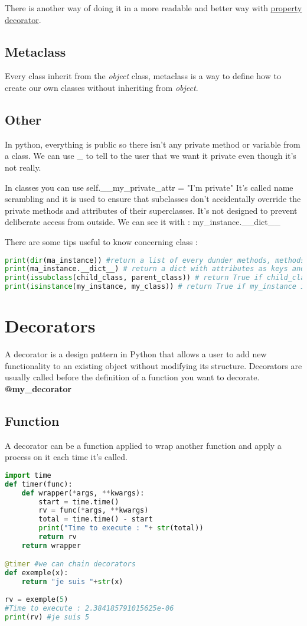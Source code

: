 \documentclass[a4paper, 12pt, titlepage]{scrartcl} %
\begin{document}
There is another way of doing it in a more readable and better way with \hyperref[subsec:Property]{property decorator}.

\subsection{Metaclass}
Every class inherit from the \textit{object} class, metaclass is a way to define how to create our own classes without inheriting from \textit{object}.

\subsection{Other}
In python, everything is public so there isn't any private method or variable from a class. We can use \_ to tell to the user that we want it private even though it's not really.

In classes you can use self.\_\_my\_private\_attr = "I'm private" 
It's called name scrambling and it is used to ensure that subclasses don't accidentally override the private methods and attributes of their superclasses. It's not designed to prevent deliberate access from outside. We can see it with : my\_instance.\_\_dict\_\_

There are some tips useful to know concerning class :
\begin{lstlisting}[language=Python]
print(dir(ma_instance)) #return a list of every dunder methods, methods and attributes from the class.
print(ma_instance.__dict__) # return a dict with attributes as keys and their value. associated.
print(issubclass(child_class, parent_class)) # return True if child_class is the child of parent_class.
print(isinstance(my_instance, my_class)) # return True if my_instance is an instance from my_class.
\end{lstlisting}

\newpage
\section{Decorators}
A decorator is a design pattern in Python that allows a user to add new functionality to an existing object without modifying its structure. Decorators are usually called before the definition of a function you want to decorate. \textbf{@my\_decorator}\newline
\subsection{Function}
A decorator can be a function applied to wrap another function and apply a process on it each time it's called.
\begin{lstlisting}[language=Python]
import time
def timer(func):
	def wrapper(*args, **kwargs):
		start = time.time()
		rv = func(*args, **kwargs)
		total = time.time() - start
		print("Time to execute : "+ str(total))
		return rv
	return wrapper

@timer #we can chain decorators
def exemple(x):
	return "je suis "+str(x)
	
rv = exemple(5)
#Time to execute : 2.384185791015625e-06
print(rv) #je suis 5
\end{lstlisting}
\end{document}

